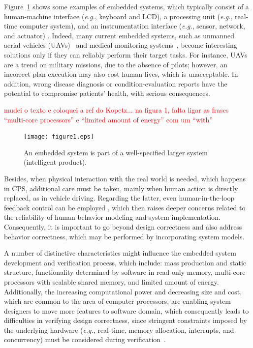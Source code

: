 \documentclass{acm_sen_article}
\begin{document}
Figure~\ref{intelligent-product} shows some examples of embedded systems, which typically consist of a human-machine interface ({\it e.g.}, keyboard and LCD), a processing unit ({\it e.g.}, real-time computer system), and an instrumentation interface ({\it e.g.}, sensor, network, and actuator) \cite{Kopetz11}. Indeed, many current embedded systems, such as unmanned aerial vehicles (UAVs)~\cite{groza2015formal} and medical monitoring systems~\cite{Cordeiro09}, become interesting solutions only if they can reliably perform their target tasks. For instance, UAVs are a trend on military missions, due to the absence of pilots; however, an incorrect plan execution may also cost human lives, which is unacceptable. In addition, wrong disease diagnosis or condition-evaluation reports have the potential to compromise patients' health, with serious consequences.
%

\textcolor{red}{mudei o texto e coloquei a ref do Kopetz... na figura 1, falta ligar as frases ``multi-core processors'' e ``limited amount of energy'' com um ``with''}

\begin{figure}[!t]
	\centering
	\texttt{[image: figure1.eps]}
	\caption{An embedded system is part of a well-specified larger system (intelligent product).}
	\label{intelligent-product}
\end{figure}

Besides, when physical interaction with the real world is needed, which happens in CPS, additional care must be taken, mainly when human action is directly replaced, as in vehicle driving. Regarding the latter, even human-in-the-loop feedback control can be employed \cite{munir}, which then raises deeper concerns related to the reliability of human behavior modeling and system implementation. Consequently, it is important to go beyond design correctness and also address behavior correctness, which may be performed by incorporating system models.

A number of distinctive characteristics might influence the embedded system development and verification process, which include: mass production and static structure, functionality determined by software in read-only memory, multi-core processors with scalable shared memory, and limited amount of energy. Additionally, the increasing computational power and decreasing size and cost, which are common to the area of computer processors, are enabling system designers to move more features to software domain, which consequently leads to difficulties in verifying design correctness, since stringent constraints imposed by the underlying hardware ({\it e.g.}, real-time, memory allocation, interrupts, and concurrency) must be considered during verification~\cite{Kroening15}.
\end{document}
